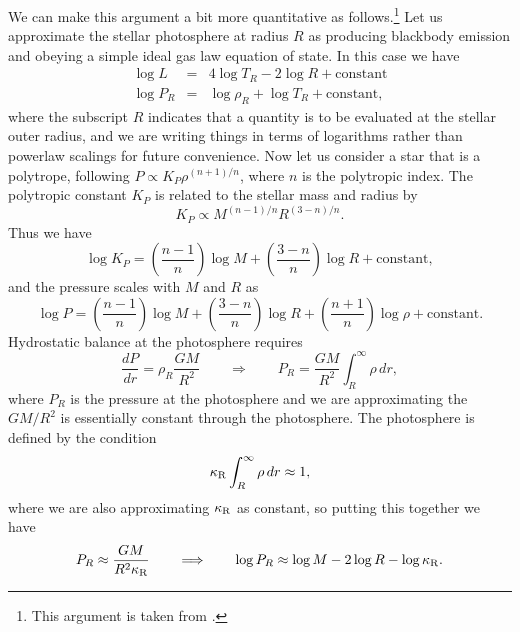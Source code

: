We can make this argument a bit more quantitative as follows.\footnote{This argument is taken from \citet{prialnik09a}.} Let us approximate the stellar photosphere at radius $R$ as producing blackbody emission and obeying a simple ideal gas law equation of state. In this case we have
\begin{eqnarray}
\label{eq:bb}
\log L & = & 4 \log T_R - 2 \log R + \mbox{constant} \\
\label{eq:idealgas}
\log P_R & = & \log \rho_R + \log T_R + \mbox{constant},
\end{eqnarray}
where the subscript $R$ indicates that a quantity is to be evaluated at the stellar outer radius, and we are writing things in terms of logarithms rather than powerlaw scalings for future convenience. Now let us consider a star that is a polytrope, following $P\propto K_P \rho^{(n+1)/n}$, where $n$ is the polytropic index. The polytropic constant $K_P$ is related to the stellar mass and radius by
\begin{equation}
K_P \propto M^{(n-1)/n}R^{(3-n)/n}.
\end{equation}
Thus we have
\begin{equation}
\log K_P = \left(\frac{n-1}{n}\right) \log M + \left(\frac{3-n}{n}\right)\log R + \mbox{constant},
\end{equation}
and the pressure scales with $M$ and $R$ as
\begin{equation}
\label{eq:polytrope}
\log P = \left(\frac{n-1}{n}\right) \log M + \left(\frac{3-n}{n}\right) \log R + \left(\frac{n+1}{n}\right) \log \rho + \mbox{constant}.
\end{equation}
Hydrostatic balance at the photosphere requires
\begin{equation}
\frac{dP}{dr} = \rho_R \frac{GM}{R^2} \qquad\Longrightarrow\qquad
P_R = \frac{GM}{R^2} \int_R^\infty \rho \, dr,
\end{equation}
where $P_R$ is the pressure at the photosphere and we are approximating the $GM/R^2$ is essentially constant through the photosphere. The photosphere is defined by the condition
\begin{equation}
\kappa_{\rm R} \int_R^\infty \rho\,dr \approx 1,
\end{equation}
where we are also approximating $\kappa_{\rm R}$ as constant, so putting this together we have
\begin{equation}
P_R \approx \frac{GM}{R^2\kappa_{\rm R}} \qquad\Longrightarrow\qquad
\log P_R \approx \log M - 2 \log R - \log \kappa_{\rm R}.
\end{equation}

